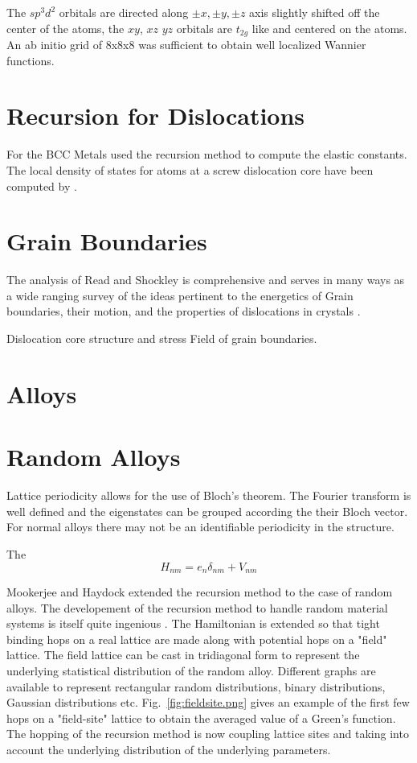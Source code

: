 The $sp^{3}d^{2}$ orbitals are directed along $\pm x, \pm y, \pm z$ axis 
slightly shifted off the center of the atoms, the $xy$, $xz$ $yz$ orbitals are
$t_{2g}$ like and centered on the atoms. An ab initio grid of 8x8x8 was sufficient
to obtain well localized Wannier functions.

\section{Recursion for Dislocations}
For the BCC Metals \cite{terakura84} used the recursion method to compute the elastic constants.
The local density of states for atoms at a screw dislocation core have been computed by \cite{paidar81}. 

\section{Grain Boundaries}
The analysis of Read and Shockley is comprehensive and serves in many ways as a wide
ranging survey of the ideas pertinent to the energetics of Grain boundaries, their motion, 
and the properties of dislocations in crystals \cite{read50}.

Dislocation core structure and stress Field of grain boundaries.

\section{Alloys}
\section{Random Alloys}
Lattice periodicity allows for the use of Bloch's theorem. The Fourier transform
is well defined and the eigenstates can be grouped according the their Bloch vector.
For normal alloys there may not be an identifiable periodicity in the structure.

The 
%
\begin{equation}
H_{nm} = e_{n}\delta_{nm} + V_{nm}
\end{equation}
%

Mookerjee and Haydock extended the recursion method to the case of random alloys.
The developement of the recursion method to handle random material systems is 
itself quite ingenious \cite{mookerjee , haydock74}. The Hamiltonian is extended
so that tight binding hops on a real lattice are made along with potential hops
on a "field" lattice. The field lattice can be cast in tridiagonal form to represent
the underlying statistical distribution of the random alloy. Different graphs are available
to represent rectangular random distributions, binary distributions, Gaussian distributions
etc. Fig.~\ref{fig:fieldsite.png} gives an example of the first few hops on a "field-site" 
lattice to obtain the averaged value of a Green's function. The hopping of the recursion method
is now coupling lattice sites and taking into account the underlying distribution of 
the underlying parameters.

